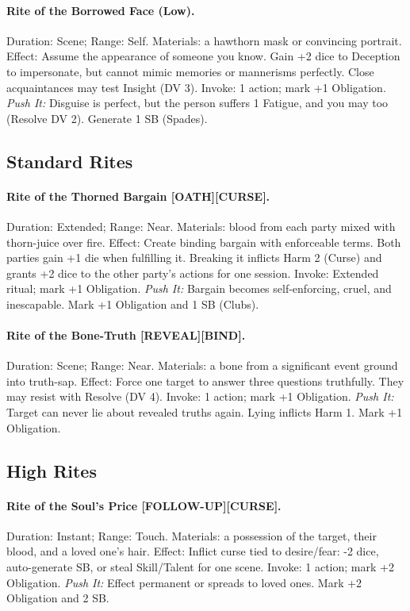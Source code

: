 \paragraph{Rite of the Borrowed Face (Low).} Duration: Scene; Range: Self.  
Materials: a hawthorn mask or convincing portrait.  
Effect: Assume the appearance of someone you know. Gain +2 dice to Deception to impersonate, but cannot mimic memories or mannerisms perfectly. Close acquaintances may test Insight (DV 3).  
Invoke: 1 action; mark +1 Obligation.  
\emph{Push It:} Disguise is perfect, but the person suffers 1 Fatigue, and you may too (Resolve DV 2). Generate 1 SB (Spades).

\subsection*{Standard Rites}
\paragraph{Rite of the Thorned Bargain [OATH][CURSE].} Duration: Extended; Range: Near.  
Materials: blood from each party mixed with thorn-juice over fire.  
Effect: Create binding bargain with enforceable terms. Both parties gain +1 die when fulfilling it. Breaking it inflicts Harm 2 (Curse) and grants +2 dice to the other party's actions for one session.  
Invoke: Extended ritual; mark +1 Obligation.  
\emph{Push It:} Bargain becomes self-enforcing, cruel, and inescapable. Mark +1 Obligation and 1 SB (Clubs).  

\paragraph{Rite of the Bone-Truth [REVEAL][BIND].} Duration: Scene; Range: Near.  
Materials: a bone from a significant event ground into truth-sap.  
Effect: Force one target to answer three questions truthfully. They may resist with Resolve (DV 4).  
Invoke: 1 action; mark +1 Obligation.  
\emph{Push It:} Target can never lie about revealed truths again. Lying inflicts Harm 1. Mark +1 Obligation.

\subsection*{High Rites}
\paragraph{Rite of the Soul's Price [FOLLOW-UP][CURSE].} Duration: Instant; Range: Touch.  
Materials: a possession of the target, their blood, and a loved one’s hair.  
Effect: Inflict curse tied to desire/fear: -2 dice, auto-generate SB, or steal Skill/Talent for one scene.  
Invoke: 1 action; mark +2 Obligation.  
\emph{Push It:} Effect permanent or spreads to loved ones. Mark +2 Obligation and 2 SB.  

